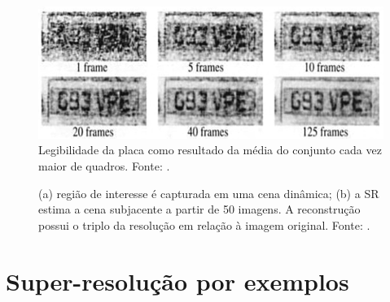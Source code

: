 \begin{figure}[h]
	\centering
	\includegraphics[scale=0.45]{figuras/SR_img_2.png}
	\caption{Legibilidade da placa como resultado da média do conjunto cada vez maior de quadros. Fonte: \cite{kang2000digital}.} 
	\label{fig:SR_2}
\end{figure}

\begin{figure}[h]
    \centering
    \qquad
    \caption{(a)  região de interesse é capturada em uma cena dinâmica; (b) a SR estima a cena subjacente a partir de 50 imagens. A reconstrução possui o triplo da resolução em relação à imagem original. Fonte: \cite{kang2000digital}. }%
	    \label{fig:SR_3}
\end{figure}


\section{Super-resolução por exemplos}

